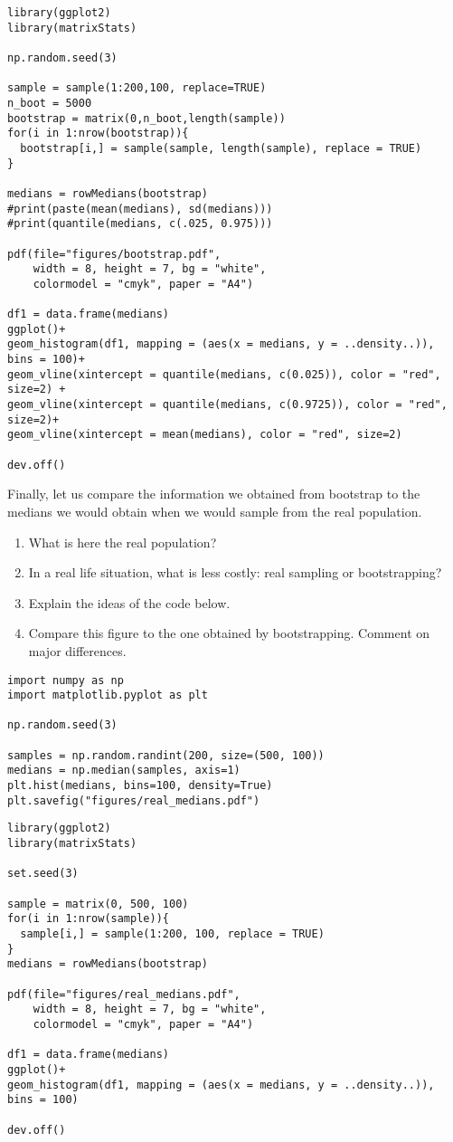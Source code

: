 \begin{verbatim}
library(ggplot2)
library(matrixStats)

np.random.seed(3)

sample = sample(1:200,100, replace=TRUE)
n_boot = 5000
bootstrap = matrix(0,n_boot,length(sample))
for(i in 1:nrow(bootstrap)){
  bootstrap[i,] = sample(sample, length(sample), replace = TRUE)
}

medians = rowMedians(bootstrap)
#print(paste(mean(medians), sd(medians)))
#print(quantile(medians, c(.025, 0.975)))

pdf(file="figures/bootstrap.pdf",
    width = 8, height = 7, bg = "white",          
    colormodel = "cmyk", paper = "A4")

df1 = data.frame(medians)
ggplot()+
geom_histogram(df1, mapping = (aes(x = medians, y = ..density..)), bins = 100)+
geom_vline(xintercept = quantile(medians, c(0.025)), color = "red", size=2) +
geom_vline(xintercept = quantile(medians, c(0.9725)), color = "red", size=2)+
geom_vline(xintercept = mean(medians), color = "red", size=2)

dev.off()
\end{verbatim}

\begin{exercise}
Finally, let us compare the information we obtained from bootstrap to the medians we would obtain when we would sample from the real population.
\begin{enumerate}
\item What is here the real population?
\item In a real life situation, what is less costly: real sampling or bootstrapping?
\item Explain the ideas of the code below.
\item Compare this figure to the one obtained by bootstrapping. Comment on major differences.
\end{enumerate}
\begin{verbatim}
import numpy as np
import matplotlib.pyplot as plt

np.random.seed(3)

samples = np.random.randint(200, size=(500, 100))
medians = np.median(samples, axis=1)
plt.hist(medians, bins=100, density=True)
plt.savefig("figures/real_medians.pdf")
\end{verbatim}

\begin{verbatim}
library(ggplot2)
library(matrixStats)

set.seed(3)

sample = matrix(0, 500, 100)
for(i in 1:nrow(sample)){
  sample[i,] = sample(1:200, 100, replace = TRUE)
}
medians = rowMedians(bootstrap)

pdf(file="figures/real_medians.pdf",
    width = 8, height = 7, bg = "white",          
    colormodel = "cmyk", paper = "A4")

df1 = data.frame(medians)
ggplot()+
geom_histogram(df1, mapping = (aes(x = medians, y = ..density..)), bins = 100)

dev.off()
\end{verbatim}
\end{exercise}





